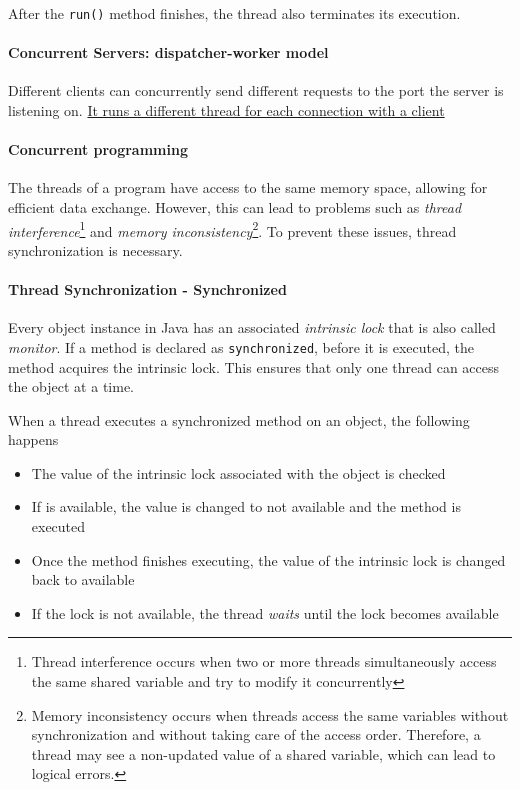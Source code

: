 After the \texttt{run()} method finishes, the thread also terminates its execution.

\paragraph{Concurrent Servers: dispatcher-worker model}
Different clients can concurrently send different requests to the port the server is listening on. \uline{It runs a different thread for each connection with a client}

\paragraph{Concurrent programming}
The threads of a program have access to the same memory space, allowing for efficient data exchange. However, this can lead to problems such as \textit{thread interference}\footnote{Thread interference occurs when two or more threads simultaneously access the same shared variable and try to modify it concurrently} and \textit{memory inconsistency}\footnote{Memory inconsistency occurs when threads access the same variables without synchronization and without taking care of the access order. Therefore, a thread may see a non-updated value of a shared variable, which can lead to logical errors.}. To prevent these issues, thread synchronization is necessary.

\paragraph{Thread Synchronization - Synchronized}
Every object instance in Java has an associated \textit{intrinsic lock} that is also called \textit{monitor}. If a method is declared as \texttt{synchronized}, before it is executed, the method acquires the intrinsic lock. This ensures that only one thread can access the object at a time.

When a thread executes a synchronized method on an object, the following happens
\begin{itemize}
    \item The value of the intrinsic lock associated with the object is checked
    \item If is available, the value is changed to not available and the method is executed
    \item Once the method finishes executing, the value of the intrinsic lock is changed back to available
    \item If the lock is not available, the thread \textit{waits} until the lock becomes available
\end{itemize}

